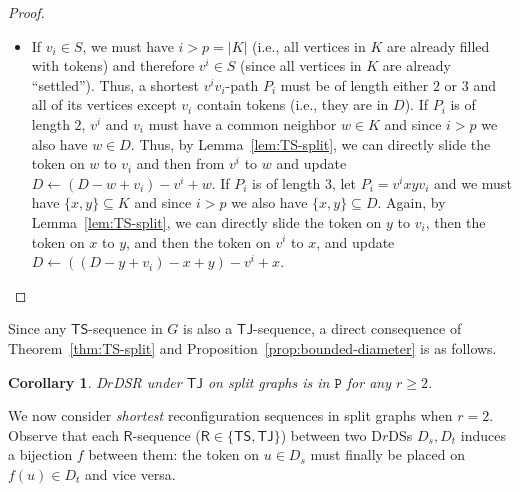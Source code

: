 \documentclass[a4paper]{article}
\theoremstyle{plain}
\newtheorem{corollary}[theorem]{Corollary}
\theoremstyle{definition}
\newcommand{\sfTS}{{\mathsf{TS}}} %
\newcommand{\sfTJ}{{\mathsf{TJ}}} %
\newcommand{\sfR}{{\mathsf{R}}} %
\newcommand{\ttP}{{\mathtt{P}}}
\begin{document}
\begin{proof}
\begin{itemize}
\begin{itemize}
			\item If $v_i \in S$, we must have $i > p = |K|$ (i.e., all vertices in $K$ are already filled with tokens) and therefore $v^i \in S$ (since all vertices in $K$ are already ``settled'').
			Thus, a shortest $v^iv_i$-path $P_i$ must be of length either $2$ or $3$ and all of its vertices except $v_i$ contain tokens (i.e., they are in $D$).
			If $P_i$ is of length $2$, $v^i$ and $v_i$ must have a common neighbor $w \in K$ and since $i > p$ we also have $w \in D$.
			Thus, by Lemma~\ref{lem:TS-split}, we can directly slide the token on $w$ to $v_i$ and then from $v^i$ to $w$ and update $D \gets (D - w + v_i) - v^i + w$.
			If $P_i$ is of length $3$, let $P_i = v^ixyv_i$ and we must have $\{x, y\} \subseteq K$ and since $i > p$ we also have $\{x, y\} \subseteq D$.
			Again, by Lemma~\ref{lem:TS-split}, we can directly slide the token on $y$ to $v_i$, then the token on $x$ to $y$, and then the token on $v^i$ to $x$, and update $D \gets ((D - y + v_i) - x + y) - v^i + x$.
		\end{itemize}
	\end{itemize}
\end{proof}

Since any $\sfTS$-sequence in $G$ is also a $\sfTJ$-sequence, a direct consequence of Theorem~\ref{thm:TS-split} and Proposition~\ref{prop:bounded-diameter} is as follows.
\begin{corollary}\label{cor:TJ-split}
	\textsc{D$r$DSR} under $\sfTJ$ on split graphs is in $\ttP$ for any $r \geq 2$.
\end{corollary}

We now consider \textit{shortest} reconfiguration sequences in split graphs when $r = 2$.
Observe that each $\sfR$-sequence ($\sfR \in \{\sfTS, \sfTJ\}$) between two D$r$DSs $D_s, D_t$ induces a bijection $f$ between them: the token on $u \in D_s$ must finally be placed on $f(u) \in D_t$ and vice versa.
\end{document}

